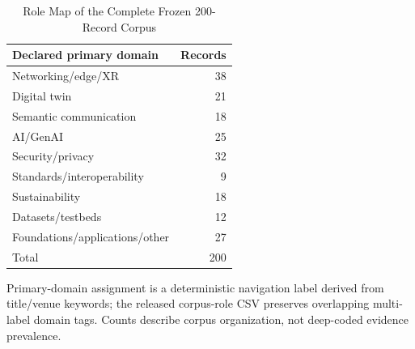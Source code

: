 \begin{table}[H]\centering\caption{Role Map of the Complete Frozen 200-Record Corpus}\label{tab:corpus200}\scriptsize\begin{tabularx}{\columnwidth}{Yr}\toprule Declared primary domain & Records\\\midrule Networking/edge/XR&38\\ Digital twin&21\\ Semantic communication&18\\ AI/GenAI&25\\ Security/privacy&32\\ Standards/interoperability&9\\ Sustainability&18\\ Datasets/testbeds&12\\ Foundations/applications/other&27\\\midrule Total&200\\\bottomrule\end{tabularx}\vspace{1mm}\par\raggedright\scriptsize Primary-domain assignment is a deterministic navigation label derived from title/venue keywords; the released corpus-role CSV preserves overlapping multi-label domain tags. Counts describe corpus organization, not deep-coded evidence prevalence.\end{table}
